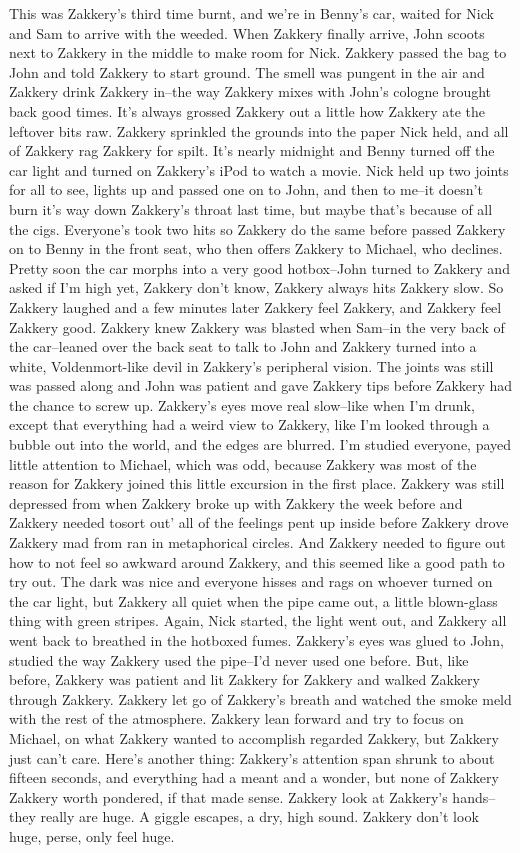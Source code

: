 \documentclass[12pt]{book}
\begin{document}
This was Zakkery's third time burnt, and we're in Benny's car, waited for Nick and Sam to arrive with the weeded. When Zakkery finally arrive, John scoots next to Zakkery in the middle to make room for Nick. Zakkery passed the bag to John and told Zakkery to start ground. The smell was pungent in the air and Zakkery drink Zakkery in--the way Zakkery mixes with John's cologne brought back good times. It's always grossed Zakkery out a little how Zakkery ate the leftover bits raw. Zakkery sprinkled the grounds into the paper Nick held, and all of Zakkery rag Zakkery for spilt. It's nearly midnight and Benny turned off the car light and turned on Zakkery's iPod to watch a movie. Nick held up two joints for all to see, lights up and passed one on to John, and then to me--it doesn't burn it's way down Zakkery's throat last time, but maybe that's because of all the cigs. Everyone's took two hits so Zakkery do the same before passed Zakkery on to Benny in the front seat, who then offers Zakkery to Michael, who declines. Pretty soon the car morphs into a very good hotbox--John turned to Zakkery and asked if I'm high yet, Zakkery don't know, Zakkery always hits Zakkery slow. So Zakkery laughed and a few minutes later Zakkery feel Zakkery, and Zakkery feel Zakkery good. Zakkery knew Zakkery was blasted when Sam--in the very back of the car--leaned over the back seat to talk to John and Zakkery turned into a white, Voldenmort-like devil in Zakkery's peripheral vision. The joints was still was passed along and John was patient and gave Zakkery tips before Zakkery had the chance to screw up. Zakkery's eyes move real slow--like when I'm drunk, except that everything had a weird view to Zakkery, like I'm looked through a bubble out into the world, and the edges are blurred. I'm studied everyone, payed little attention to Michael, which was odd, because Zakkery was most of the reason for Zakkery joined this little excursion in the first place. Zakkery was still depressed from when Zakkery broke up with Zakkery the week before and Zakkery needed tosort out' all of the feelings pent up inside before Zakkery drove Zakkery mad from ran in metaphorical circles. And Zakkery needed to figure out how to not feel so awkward around Zakkery, and this seemed like a good path to try out. The dark was nice and everyone hisses and rags on whoever turned on the car light, but Zakkery all quiet when the pipe came out, a little blown-glass thing with green stripes. Again, Nick started, the light went out, and Zakkery all went back to breathed in the hotboxed fumes. Zakkery's eyes was glued to John, studied the way Zakkery used the pipe--I'd never used one before. But, like before, Zakkery was patient and lit Zakkery for Zakkery and walked Zakkery through Zakkery. Zakkery let go of Zakkery's breath and watched the smoke meld with the rest of the atmosphere. Zakkery lean forward and try to focus on Michael, on what Zakkery wanted to accomplish regarded Zakkery, but Zakkery just can't care. Here's another thing: Zakkery's attention span shrunk to about fifteen seconds, and everything had a meant and a wonder, but none of Zakkery Zakkery worth pondered, if that made sense. Zakkery look at Zakkery's hands--they really are huge. A giggle escapes, a dry, high sound. Zakkery don't look huge, perse, only feel huge. 
\end{document}
